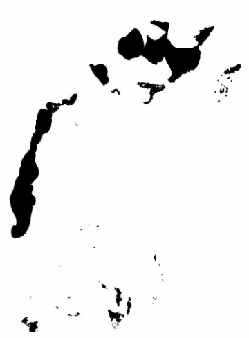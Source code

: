 \documentclass[12pt,a4paper]{article}
\begin{document}
\begin{figure}
\begin{subfigure}[b]{0.19\textwidth}
         \includegraphics[width=\textwidth]{../img/2014w.jpg}
         \caption{}
         \label{fig:three sin x}
     \end{subfigure}
     \begin{subfigure}[b]{0.19\textwidth}
         \centering

\end{subfigure}
\end{figure}
\end{document}
